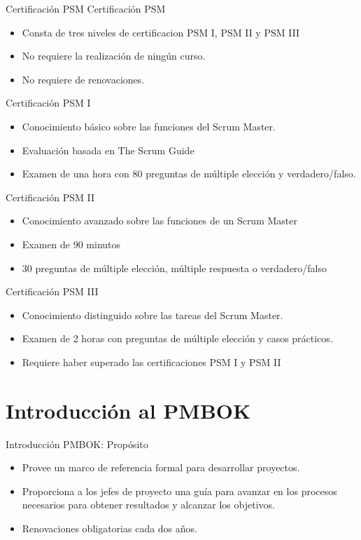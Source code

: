 \begin{frame}[allowframebreaks]{Certificación PSM}
	Certificación PSM 

	\begin{itemize}
		\item Consta de tres niveles de certificacion PSM I, PSM II y PSM III
		\item No requiere la realización de ningún curso.
		\item No requiere de renovaciones.
	\end{itemize}

	\framebreak

	Certificación PSM I
	\begin{itemize}
		\item Conocimiento básico sobre las funciones del Scrum Master.
		\item Evaluación basada en The Scrum Guide
		\item Examen de una hora con 80 preguntas de múltiple elección y verdadero/falso.
	\end{itemize}

	\framebreak

	Certificación PSM II
	\begin{itemize}
		\item Conocimiento avanzado sobre las funciones de un Scrum Master
		\item Examen de 90 minutos
		\item 30 preguntas de múltiple elección, múltiple respuesta o verdadero/falso
	\end{itemize}

	\framebreak

	Certificación PSM III
	\begin{itemize}
		\item Conocimiento distinguido sobre las tareas del Scrum Master.
		\item Examen de 2 horas con preguntas de múltiple elección y casos prácticos.
		\item Requiere haber superado las certificaciones PSM I y PSM II
	\end{itemize}


\end{frame}


\section{Introducción al PMBOK}

\begin{frame}[allowframebreaks]{Introducción PMBOK: Propósito}
	
	\begin{itemize}
		\item Provee un marco de referencia formal para desarrollar proyectos. 
		\item Proporciona a los jefes de proyecto una guía para avanzar en los procesos necesarios para obtener resultados y alcanzar los objetivos.
		\item Renovaciones obligatorias cada dos años.
	\end{itemize}

\end{frame}

